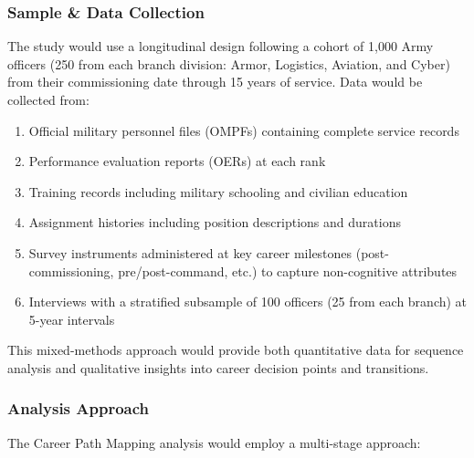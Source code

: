 \documentclass[
  letterpaper,
  DIV=11,
  numbers=noendperiod]{scrartcl}
\providecommand{\tightlist}{%
  \setlength{\itemsep}{0pt}\setlength{\parskip}{0pt}}
\begin{document}
\subsubsection{Sample \& Data Collection}\label{sample-data-collection}

The study would use a longitudinal design following a cohort of 1,000
Army officers (250 from each branch division: Armor, Logistics,
Aviation, and Cyber) from their commissioning date through 15 years of
service. Data would be collected from:

\begin{enumerate}
\def\labelenumi{\arabic{enumi}.}
\tightlist
\item
  Official military personnel files (OMPFs) containing complete service
  records
\item
  Performance evaluation reports (OERs) at each rank
\item
  Training records including military schooling and civilian education
\item
  Assignment histories including position descriptions and durations
\item
  Survey instruments administered at key career milestones
  (post-commissioning, pre/post-command, etc.) to capture non-cognitive
  attributes
\item
  Interviews with a stratified subsample of 100 officers (25 from each
  branch) at 5-year intervals
\end{enumerate}

This mixed-methods approach would provide both quantitative data for
sequence analysis and qualitative insights into career decision points
and transitions.

\subsubsection{Analysis Approach}\label{analysis-approach}

The Career Path Mapping analysis would employ a multi-stage approach:
\end{document}
